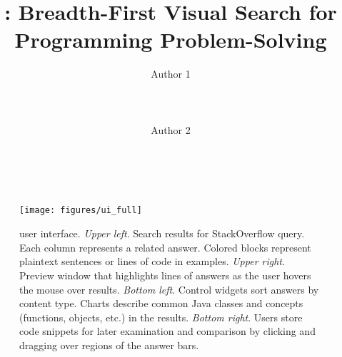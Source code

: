 \documentclass{sigchi}
\begin{document}
\title{\systemname{}: Breadth-First Visual Search for Programming Problem-Solving}

\author{
  \alignauthor Author 1\\
    \\
    \\
    \\
  \alignauthor Author 2\\
    \\
    \\
}
\fi

\makeatletter
\let\@oldmaketitle\@maketitle
\renewcommand{\@maketitle}{\@oldmaketitle}
\makeatother

\maketitle





\begin{figure*}
 \centering
 \texttt{[image: figures/ui\_full]}
 \caption{\systemname{} user interface. 
 \emph{Upper left}.
 Search results for StackOverflow query.
 Each column represents a related answer.
 Colored blocks represent plaintext sentences or lines of code in examples.
 \emph{Upper right}.
 Preview window that highlights lines of answers as the user hovers the mouse over results.
 \emph{Bottom left}.
 Control widgets sort answers by content type.
 Charts describe common Java classes and concepts (functions, objects, etc.) in the results.
 \emph{Bottom right}.
 Users store code snippets for later examination and comparison by clicking and dragging over regions of the answer bars.
 }
 \label{fig:user_interface}
\end{figure*}











%
%
%
%
%
\balance



\end{document}

